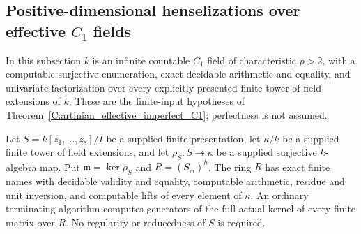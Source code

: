 \subsection[Positive-dimensional henselizations over effective C1 fields]{Positive-dimensional henselizations over effective $C_1$ fields}
\label{C:C1-henselizations-subsection}

In this subsection $k$ is an infinite countable $C_1$ field
of characteristic $p>2$, with a computable surjective
enumeration, exact decidable arithmetic and equality,
and univariate factorization over every explicitly
presented finite tower of field extensions of $k$.
These are the finite-input hypotheses of
Theorem~\ref{C:artinian_effective_imperfect_C1};
perfectness is not assumed.

\begin{lemma}
\label{C:C1-henselization-access}
Let $S=k[z_1,\ldots,z_s]/I$ be a supplied finite
presentation, let $\kappa/k$ be a supplied finite
tower of field extensions, and let
$\rho_S:S\twoheadrightarrow\kappa$ be a supplied
surjective $k$-algebra map.  Put
$\mathfrak m=\ker\rho_S$ and $R=(S_{\mathfrak m})^h$.
The ring $R$ has exact finite names with decidable
validity and equality, computable arithmetic,
residue and unit inversion, and computable lifts
of every element of $\kappa$.
An ordinary terminating algorithm computes generators
of the full actual kernel of every finite matrix
over $R$.  No regularity or reducedness of $S$
is required.
\end{lemma}
